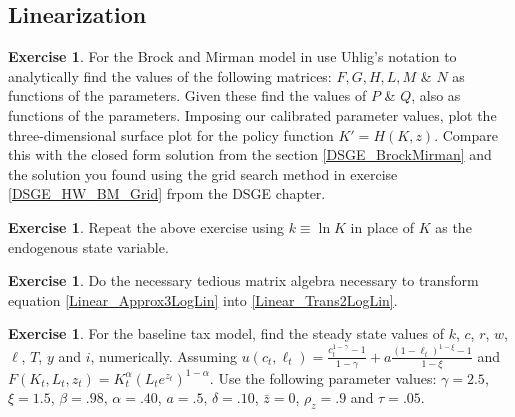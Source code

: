 \documentclass[letterpaper,12pt]{article}
\theoremstyle{definition}
\newtheorem{exercise}[theorem]{Exercise}
\begin{document}
\begin{spacing}{1.5}
	

\section*{Linearization}\label{Linear_HW}

	\begin{exercise} \label{Linear_HW_BM_Coeffs}
		For the Brock and Mirman model in use Uhlig's notation to analytically find the values of the following matrices: $F, G, H, L, M$ \& $N$ as functions of the parameters.  Given these find the values of $P$ \& $Q$, also as functions of the parameters.  Imposing our calibrated parameter values, plot the three-dimensional surface plot for the policy function $K' = H(K,z)$.  Compare this with the closed form solution from the section \eqref{DSGE_BrockMirman} and the solution you found using the grid search method in exercise \ref{DSGE_HW_BM_Grid} frpom the DSGE chapter.
	\end{exercise}

	\begin{exercise} \label{Linear_HW_BM_Coeffs_Log}
		Repeat the above exercise using $k \equiv \ln K$ in place of $K$ as the endogenous state variable.
	\end{exercise}

	\begin{exercise} \label{Linear_HW_Algebra}
		Do the necessary tedious matrix algebra necessary to transform equation \eqref{Linear_Approx3LogLin} into \eqref{Linear_Trans2LogLin}.
	\end{exercise}

	\begin{exercise} \label{Linear_HW_Base_Numer_SS}
		For the baseline tax model, find the steady state values of $k$, $c$, $r$, $w$, $\ell$, $T$, $y$ and $i$, numerically.  Assuming $u(c_t,\ell_t) = \frac{c^{1-\gamma}_t -1}{1-\gamma}+ a \frac{(1-\ell_t)^{1-\xi}-1}{1-\xi}$ and $F(K_t,L_t,z_t) = K^{\alpha}_t (L_te^{z_t})^{1-\alpha} $.  Use the following parameter values: $\gamma = 2.5$, $\xi = 1.5$,  $\beta = .98$, $\alpha = .40$, $a=.5$, $\delta = .10$, $\bar z = 0$, $\rho_z=.9$ and $\tau = .05$.
	\end{exercise}


\end{spacing}
\end{document}

